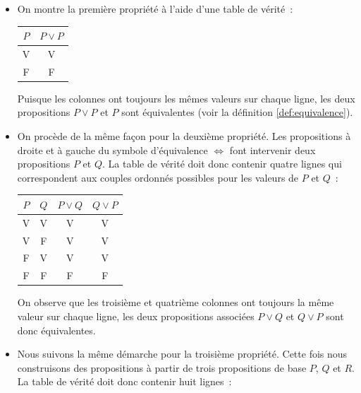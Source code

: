 \documentclass[10pt,notheorems]{beamer}
\theoremstyle{plain}
\theoremstyle{definition} %
\begin{document}
  \begin{notes}
    \begin{itemize}
    \item On montre la première propriété à l'aide d'une table de
      vérité~:
      \begin{table}
        \centering
        \begin{tabular}[H]{|c|c|}
          \hline
          $P$ & $P \lor P$ \\ \hline
          V & V \\
          F & F \\
          \hline\hline
        \end{tabular}
      \end{table}
      Puisque les colonnes ont toujours les mêmes valeurs sur chaque
      ligne, les deux propositions $P\lor P$ et $P$ sont équivalentes
      (voir la définition \hyperlink{slide_equivalence_logique_1}{\ref{def:equivalence}}).
    \item On procède de la même façon pour la deuxième propriété. Les
      propositions à droite et à gauche du symbole d'équivalence
      $\Leftrightarrow$ font intervenir deux propositions $P$ et
      $Q$. La table de vérité doit donc contenir quatre lignes qui
      correspondent aux couples ordonnés possibles pour les
      valeurs de $P$ et $Q$~:
      \begin{table}[H]
        \centering
        \begin{tabular}[H]{|cc|cc|}
          \hline
          $P$ & $Q$ & $P \lor Q$ & $Q \lor P$\\ \hline
          V & V & V & V\\
          V & F & V & V\\
          F & V & V & V\\
          F & F & F & F \\
          \hline\hline
        \end{tabular}
      \end{table}
      On observe que les troisième et quatrième colonnes ont toujours
      la même valeur sur chaque ligne, les deux propositions associées
      $P \lor Q$ et $Q \lor P$ sont donc
      équivalentes.
    \item Nous suivons la même démarche pour la troisième
      propriété. Cette fois nous construisons des propositions à
      partir de trois propositions de base $P$, $Q$ et $R$. La table
      de vérité doit donc contenir huit lignes~:
      \begin{table}[H]
        \centering

\end{table}
\end{itemize}
\end{notes}
\end{document}
